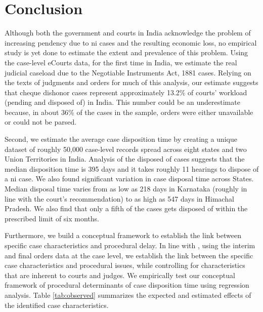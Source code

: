 \documentclass[12pt,a4paper]{article}
\begin{document}
	\section{Conclusion}
	\label{sec:conclusion}
	
	Although both the government and courts in India acknowledge the problem of increasing pendency due to \gls{ni} cases and the resulting economic loss, no empirical study is yet done to estimate the extent and prevalence of this problem. Using the case-level eCourts data, for the first time in India, we estimate the real judicial caseload due to the Negotiable Instruments Act, 1881 cases. Relying on the texts of judgments and orders for much of this analysis, our estimate suggests that cheque dishonor cases represent approximately 13.2\% of courts' workload (pending and disposed of) in India. This number could be an underestimate because, in about 36\% of the cases in the sample, orders were either unavailable or could not be parsed.
	
	Second, we estimate the average case disposition time by creating a unique dataset of roughly 50,000 case-level records spread across eight states and two Union Territories in India. Analysis of the disposed of cases suggests that the median disposition time is 395 days and it takes roughly 11 hearings to dispose of a \gls{ni} case. We also found significant variation in case disposal time across States. Median disposal time varies from as low as 218 days in Karnataka (roughly in line with the court's recommendation) to as high as 547 days in Himachal Pradesh. We also find that only a fifth of the cases gets disposed of within the prescribed limit of six months.
	
	Furthermore, we build a conceptual framework to establish the link between specific case characteristics and procedural delay. In line with \cite{bielen2015}, using the interim and final orders data at the case level, we establish the link between the specific case characteristics and procedural issues, while controlling for characteristics that are inherent to courts and judges. We empirically test our conceptual framework of procedural determinants of case disposition time using regression analysis. Table \ref{tab:observed} summarizes the expected and estimated effects of the identified case characteristics.
	
\end{document}
